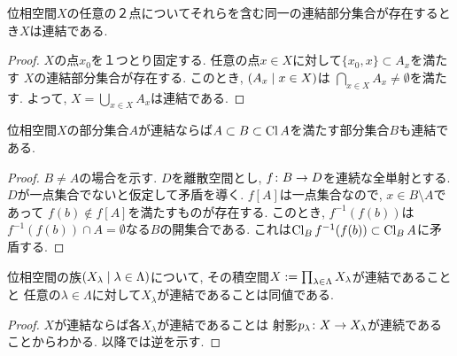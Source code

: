 \documentclass[uplatex, dvipdfmx, a4paper, 12pt, class=jsbook, crop=false]{standalone}
\begin{document}
\begin{corollary}
	位相空間$ X $の任意の２点についてそれらを含む同一の連結部分集合が存在するとき$ X $は連結である.
\end{corollary}

\begin{proof}
	$ X $の点$ x_0 $を１つとり固定する. 任意の点$ x \in X $に対して$ \{x_0, x\} \subset A_x $を満たす
	$ X $の連結部分集合が存在する. このとき, $ \setfamily{A_x}{x \in X} $は
	$ \bigcap_{x \in X} A_x \neq \emptyset$を満たす. よって, $ X = \bigcup_{x \in X} A_x $は連結である.
\end{proof}

\begin{proposition}
	\label{prop:Closure of a connected subspace is connected}
	位相空間$ X $の部分集合$ A $が連結ならば$ A \subset B \subset \mathop{\mathrm{Cl}}\nolimits A $を満たす部分集合$ B $も連結である.
\end{proposition}

\begin{proof}
	$ B \neq A $の場合を示す. $ D $を離散空間とし, $ f\colon B\to D $を連続な全単射とする.
	$ D $が一点集合でないと仮定して矛盾を導く.
	$ f[A] $は一点集合なので, $ x \in B \setminus A $であって
	$ f(b) \notin f[A] $を満たすものが存在する.
	このとき, $ f^{-1}(f(b)) $は$ f^{-1}(f(b)) \cap A = \emptyset $なる$ B $の開集合である.
	これは$ \mathop{\mathrm{Cl}}\nolimits_B f^{-1}(f(b)) \subset \mathop{\mathrm{Cl}}\nolimits_B A $に矛盾する.
\end{proof}

\begin{proposition}
	\label{prop:A product space of connected spaces is connected}
	位相空間の族$ \setfamily{X_\lambda}{\lambda \in \Lambda} $について,
	その積空間$ X \mathrel{:=} \prod_{\lambda \in \Lambda} X_\lambda $が連結であることと
	任意の$ \lambda \in \Lambda $に対して$ X_\lambda $が連結であることは同値である.
\end{proposition}

\begin{proof}
	$ X $が連結ならば各$ X_\lambda $が連結であることは
	射影$ p_\lambda\colon X\to X_\lambda $が連続であることからわかる.
	以降では逆を示す.
	\WIP
\end{proof}
\end{document}
